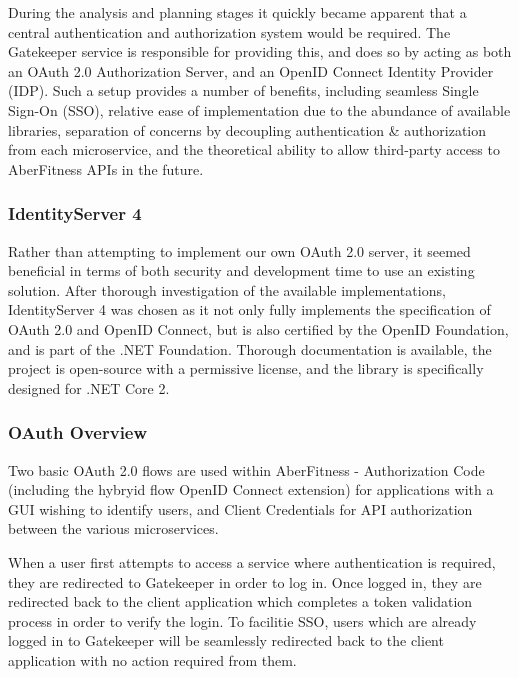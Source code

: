 During the analysis and planning stages it quickly became apparent that a central authentication and authorization system would be required.  The Gatekeeper service is responsible for providing this, and does so by acting as both an OAuth 2.0 Authorization Server, and an OpenID Connect Identity Provider (IDP).  Such a setup provides a number of benefits, including seamless Single Sign-On (SSO), relative ease of implementation due to the abundance of available libraries, separation of concerns by decoupling authentication \& authorization from each microservice, and the theoretical ability to allow third-party access to AberFitness APIs in the future.

\subsubsection{IdentityServer 4}

Rather than attempting to implement our own OAuth 2.0 server, it seemed beneficial in terms of both security and development time to use an existing solution.  After thorough investigation of the available implementations, IdentityServer 4 was chosen as it not only fully implements the specification of OAuth 2.0 and OpenID Connect, but is also certified by the OpenID Foundation, and is part of the .NET Foundation.  Thorough documentation is available, the project is open-source with a permissive license, and the library is specifically designed for .NET Core 2.

\subsubsection{OAuth Overview}

Two basic OAuth 2.0 flows are used within AberFitness - Authorization Code (including the hybryid flow OpenID Connect extension) for applications with a GUI wishing to identify users, and Client Credentials for API authorization between the various microservices.

When a user first attempts to access a service where authentication is required, they are redirected to Gatekeeper in order to log in.  Once logged in, they are redirected back to the client application which completes a token validation process in order to verify the login.  To facilitie SSO, users which are already logged in to Gatekeeper will be seamlessly redirected back to the client application with no action required from them.

